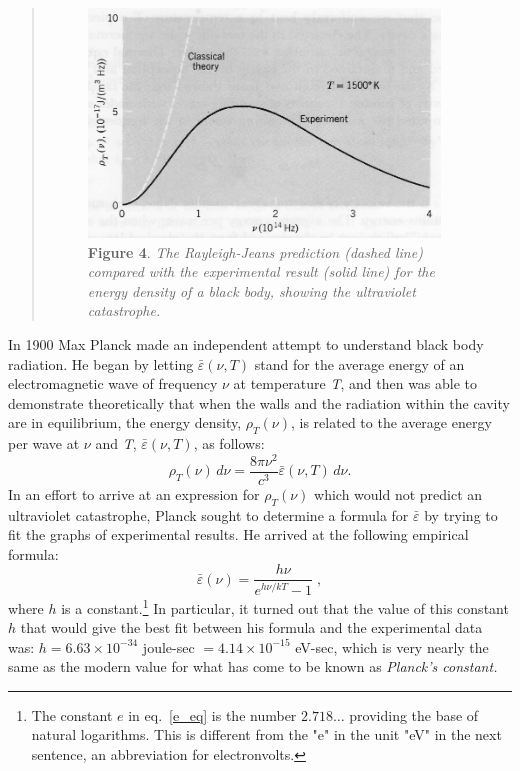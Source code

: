 \begin{quotation}
%
\begin{figure}[h]
  \begin{center}
  \captionsetup{width=3.67708in}
  \includegraphics[width=3.67708in,height=2.39583in]{images/05_planck/image017.jpg}
  \caption*{\textbf{Figure 4}. \emph{The Rayleigh-Jeans prediction (dashed line) compared
    with the experimental result (solid line) for the energy density of a
    black body, showing the ultraviolet catastrophe.}}
  \end{center}
\end{figure}
%
\end{quotation}

In 1900 Max Planck made an independent attempt to understand black body
radiation. He began by letting $\bar{\varepsilon}(\nu, T)$ stand for the average
energy of an electromagnetic wave of frequency $\nu$ at temperature
\emph{T}, and then was able to demonstrate theoretically that when the
walls and the radiation within the cavity are in equilibrium, the energy
density, $\rho_T(\nu)$, is related to the average
energy per wave at $\nu$ and \emph{T}, $\bar{\varepsilon}(\nu, T)$, as follows:
%
\setcounter{equation}{9}
\begin{equation}\label{eq:planck_10}
\rho_T(\nu)\, d\nu = \frac{8\pi \nu^2}{c^3}\bar{\varepsilon}(\nu, T)\, d\nu. %
\end{equation}
%
In an effort to arrive at an expression for $\rho_T(\nu)$
which would not predict an ultraviolet catastrophe, Planck sought to
determine a formula for $\bar{\varepsilon}$ by trying to fit the graphs of experimental
results. He arrived at the following empirical formula:
\begin{equation}\label{e_eq}
\bar{\varepsilon}(\nu) = \frac{h\nu}{e^{h\nu/kT}-1} \; , %
\end{equation}
where $h$ is a constant.\footnote{The constant $e$ in eq.~\eqref{e_eq} is the number $2.718\dots$ providing the base of natural logarithms. This is different from the "e" in the unit "eV" in the next sentence, an abbreviation for electronvolts.} In particular, it turned out that the
value of this constant $h$ that would give the best fit between his
formula and the experimental data was: $h = 6.63\! \times\!
10^{-34}$ joule-sec $= 4.14\! \times\! 10^{-15}$
eV-sec, which is very nearly the same as the modern value for what has
come to be known as \emph{Planck's constant.}

